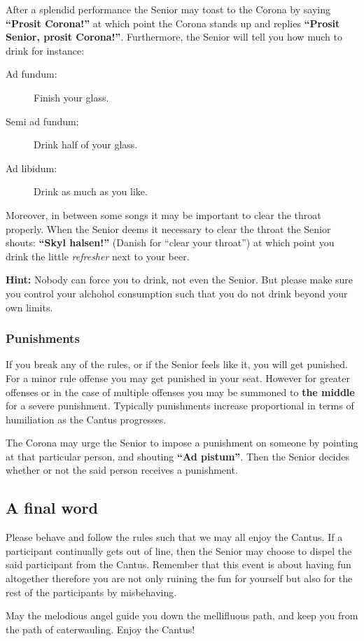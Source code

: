After a splendid performance the Senior may toast to the Corona by saying \textbf{``Prosit Corona!''} at which point the Corona stands up and replies \textbf{``Prosit Senior, prosit Corona!''}. Furthermore, the Senior will tell you how much to drink for instance:
\begin{description}
        \item[Ad fundum:] Finish your glass.
        \item[Semi ad fundum:] Drink half of your glass.
        \item[Ad libidum:] Drink as much as you like.
\end{description}
Moreover, in between some songs it may be important to clear the throat properly. When the Senior deems it necessary to clear the throat the Senior shouts: \textbf{``Skyl halsen!''} (Danish for ``clear your throat'') at which point you drink the little \emph{refresher} next to your beer.

\textbf{Hint:} Nobody can force you to drink, not even the Senior. But please make sure you control your alchohol consumption such that you do not drink beyond your own limits.

\subsubsection*{Punishments}
If you break any of the rules, or if the Senior feels like it, you will get punished. For a minor rule offense you may get punished in your seat. However for greater offenses or in the case of multiple offenses you may be summoned to \textbf{the middle} for a severe punishment. Typically punishments increase proportional in terms of humiliation as the Cantus progresses.

The Corona may urge the Senior to impose a punishment on someone by pointing at that particular person, and shouting \textbf{``Ad pistum''}. Then the Senior decides whether or not the said person receives a punishment.

\subsection{A final word}
Please behave and follow the rules such that we may all enjoy the Cantus.
If a participant continually gets out of line, then the Senior may choose to dispel the said participant from the Cantus.
Remember that this event is about having fun altogether therefore you are not only ruining the fun for yourself but also for the rest of the participants by misbehaving.

May the melodious angel guide you down the mellifluous path, and keep you from the path of caterwauling. Enjoy the Cantus!

